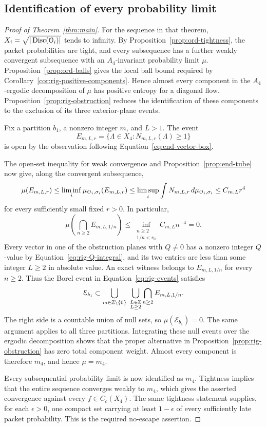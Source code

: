 \subsection{Identification of every probability limit}

\begin{proof}[Proof of Theorem~\ref{thm:main}]
For the sequence in that theorem,
$X_i=\sqrt{|\operatorname{Disc}(\mathcal O_i)|}$ tends to infinity.  By
Proposition~\ref{prop:ord-tightness}, the packet probabilities are tight,
and every subsequence has a further weakly convergent subsequence with
an $A_4$-invariant probability limit $\mu$.
Proposition~\ref{prop:ord-balls} gives the local ball bound required by
Corollary~\ref{cor:rig-positive-components}.  Hence almost every component in
the $A_4$-ergodic decomposition of $\mu$ has positive entropy for a
diagonal flow.  Proposition~\ref{prop:rig-obstruction} reduces the
identification of these components to the exclusion of its three
exterior-plane events.

Fix a partition $b_1$, a nonzero integer $m$, and $L>1$.  The event
\[
 E_{m,L,r}=\{\Lambda\in X_4:N_{m,L,r}(\Lambda)\ge1\}
\]
is open by the observation following Equation~\eqref{eq:end-vector-box}.

The open-set inequality for weak convergence and
Proposition~\ref{prop:end-tube} now give, along the convergent subsequence,
\[
 \mu(E_{m,L,r})
  \le\liminf_i\mu_{\mathcal O_i,\sigma_i}(E_{m,L,r})
  \le\limsup_i\int N_{m,L,r}\,d\mu_{\mathcal O_i,\sigma_i}
  \le C_{m,L}r^4
\]
for every sufficiently small fixed $r>0$.  In particular,
\[
 \mu\left(\bigcap_{n\ge2}E_{m,L,1/n}\right)
 \le \inf_{\substack{n\ge2\\1/n<r_0}} C_{m,L}n^{-4}=0.
\]
Every vector in one of the obstruction planes with $Q\ne0$ has a
nonzero integer $Q$-value by Equation~\eqref{eq:rig-Q-integral}, and its
two entries are less than some integer $L\ge2$ in absolute value.
An exact witness belongs to $E_{m,L,1/n}$ for every $n\ge2$.  Thus the
Borel event in Equation~\eqref{eq:rig-events} satisfies
\[
 \mathcal E_{b_1}
 \subset
 \bigcup_{m\in\mathbb Z\setminus\{0\}}\ \bigcup_{\substack{L\in\mathbb Z\\L\ge2}}
       \bigcap_{n\ge2}E_{m,L,1/n}.
\]
The right side is a countable union of null sets, so
$\mu(\mathcal E_{b_1})=0$.  The same argument applies to
all three partitions.  Integrating these null events over the ergodic
decomposition shows that the proper alternative in
Proposition~\ref{prop:rig-obstruction} has zero total component weight.
Almost every component is therefore $m_4$, and hence $\mu=m_4$.

Every subsequential probability limit is now identified as $m_4$.
Tightness implies that the entire sequence converges weakly to $m_4$,
which gives the asserted convergence against every $f\in C_c(X_4)$.
The same tightness statement supplies, for each $\epsilon>0$, one
compact set carrying at least $1-\epsilon$ of every sufficiently late
packet probability.  This is the required no-escape assertion.
\end{proof}
